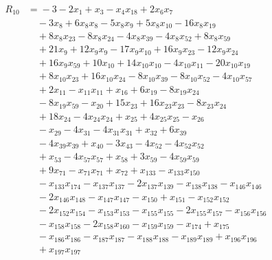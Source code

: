 \begin{align*}
R_{10}&={}-3 -2x_{1} +x_{3} -x_{4}x_{18} +2x_{6}x_{7}\\
&\quad{}-3x_{8} +6x_{8}x_{8} -5x_{8}x_{9} +5x_{8}x_{10} -16x_{8}x_{19}\\
&\quad{}+8x_{8}x_{23} -8x_{8}x_{24} -4x_{8}x_{39} -4x_{8}x_{52} +8x_{8}x_{59}\\
&\quad{}+21x_{9} +12x_{9}x_{9} -17x_{9}x_{10} +16x_{9}x_{23} -12x_{9}x_{24}\\
&\quad{}+16x_{9}x_{59} +10x_{10} +14x_{10}x_{10} -4x_{10}x_{11} -20x_{10}x_{19}\\
&\quad{}+8x_{10}x_{23} +16x_{10}x_{24} -8x_{10}x_{39} -8x_{10}x_{52} -4x_{10}x_{57}\\
&\quad{}+2x_{11} -x_{11}x_{11} +x_{16} +6x_{19} -8x_{19}x_{24}\\
&\quad{}-8x_{19}x_{59} -x_{20} +15x_{23} +16x_{23}x_{23} -8x_{23}x_{24}\\
&\quad{}+18x_{24} -4x_{24}x_{24} +x_{25} +4x_{25}x_{25} -x_{26}\\
&\quad{}-x_{29} -4x_{31} -4x_{31}x_{31} +x_{32} +6x_{39}\\
&\quad{}-4x_{39}x_{39} +x_{40} -3x_{43} -4x_{52} -4x_{52}x_{52}\\
&\quad{}+x_{53} -4x_{57}x_{57} +x_{58} +3x_{59} -4x_{59}x_{59}\\
&\quad{}+9x_{71} -x_{71}x_{71} +x_{72} +x_{133} -x_{133}x_{150}\\
&\quad{}-x_{133}x_{174} -x_{137}x_{137} -2x_{137}x_{139} -x_{138}x_{138} -x_{146}x_{146}\\
&\quad{}-2x_{146}x_{148} -x_{147}x_{147} -x_{150} +x_{151} -x_{152}x_{152}\\
&\quad{}-2x_{152}x_{154} -x_{153}x_{153} -x_{155}x_{155} -2x_{155}x_{157} -x_{156}x_{156}\\
&\quad{}-x_{158}x_{158} -2x_{158}x_{160} -x_{159}x_{159} -x_{174} +x_{175}\\
&\quad{}-x_{186}x_{186} -x_{187}x_{187} -x_{188}x_{188} -x_{189}x_{189} +x_{196}x_{196}\\
&\quad{}+x_{197}x_{197}
\end{align*}
